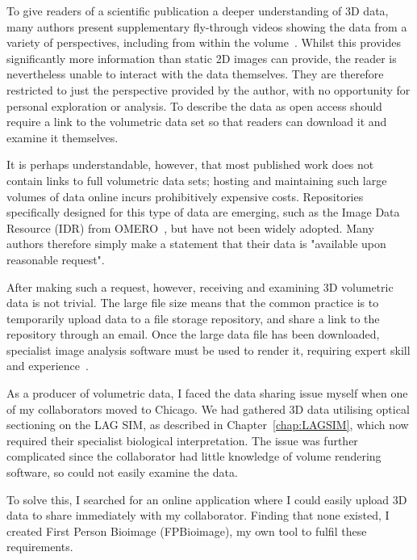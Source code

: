 To give readers of a scientific publication a deeper understanding of 3D data, many authors present supplementary fly-through videos showing the data from a variety of perspectives, including from within the volume~\cite{huang2016ultra, legant2016high, fu2016imaging, chhetri2015whole}. 
Whilst this provides significantly more information than static 2D images can provide, the reader is nevertheless unable to interact with the data themselves. 
They are therefore restricted to just the perspective provided by the author, with no opportunity for personal exploration or analysis.
To describe the data as open access should require a link to the volumetric data set so that readers can download it and examine it themselves. 

It is perhaps understandable, however, that most published work does not contain links to full volumetric data sets; hosting and maintaining such large volumes of data online incurs prohibitively expensive costs. 
Repositories specifically designed for this type of data are emerging, such as the Image Data Resource (IDR) from OMERO~\cite{williams2017image}, but have not been widely adopted. 
Many authors therefore simply make a statement that their data is "available upon reasonable request". 

After making such a request, however, receiving and examining 3D volumetric data is not trivial. 
The large file size means that the common practice is to temporarily upload data to a file storage repository, and share a link to the repository through an email. 
Once the large data file has been downloaded, specialist image analysis software must be used to render it, requiring expert skill and experience~\cite{broeke2015image}. 

As a producer of volumetric data, I faced the data sharing issue myself when one of my collaborators moved to Chicago. 
We had gathered 3D data utilising optical sectioning on the LAG SIM, as described in Chapter~\ref{chap:LAGSIM}, which now required their specialist biological interpretation. 
The issue was further complicated since the collaborator had little knowledge of volume rendering software, so could not easily examine the data. 

To solve this, I searched for an online application where I could easily upload 3D data to share immediately with my collaborator. 
Finding that none existed, I created First Person Bioimage (FPBioimage), my own tool to fulfil these requirements.

